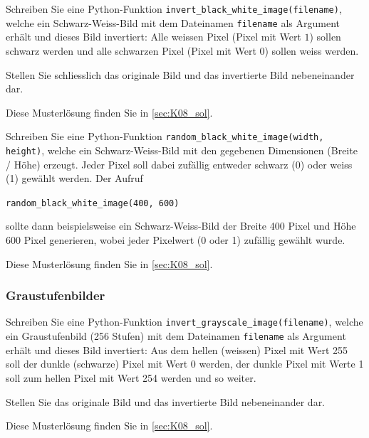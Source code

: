\begin{myexercise}
	Schreiben Sie eine Python-Funktion \lstinline|invert_black_white_image(filename)|, welche ein Schwarz-Weiss-Bild mit dem Dateinamen \lstinline|filename| als Argument erhält und dieses Bild invertiert: Alle weissen Pixel (Pixel mit Wert $1$) sollen schwarz werden und alle schwarzen Pixel (Pixel mit Wert $0$) sollen weiss werden.

	Stellen Sie schliesslich das originale Bild und das invertierte Bild nebeneinander dar.
	\begin{myanswer}
		Diese Musterlösung finden Sie in \cref{sec:K08_sol}.
	\end{myanswer}
\end{myexercise}

\begin{myexercise}
	Schreiben Sie eine Python-Funktion \lstinline|random_black_white_image(width, height)|, welche ein Schwarz-Weiss-Bild mit den gegebenen Dimensionen (Breite / Höhe) erzeugt.
	Jeder Pixel soll dabei zufällig entweder schwarz (0) oder weiss (1) gewählt werden. Der Aufruf
	\begin{center}
		\lstinline|random_black_white_image(400, 600)|
	\end{center}
	sollte dann beispielsweise ein Schwarz-Weiss-Bild der Breite 400 Pixel und Höhe 600 Pixel generieren, wobei jeder Pixelwert (0 oder 1) zufällig gewählt wurde.
	\begin{myanswer}
		Diese Musterlösung finden Sie in \cref{sec:K08_sol}.
	\end{myanswer}
\end{myexercise}

\subsubsection{Graustufenbilder}
\begin{myexercise}
	Schreiben Sie eine Python-Funktion \lstinline|invert_grayscale_image(filename)|, welche ein Graustufenbild (256 Stufen) mit dem Dateinamen \lstinline|filename| als Argument erhält und dieses Bild invertiert: Aus dem hellen (weissen) Pixel mit Wert 255 soll der dunkle (schwarze) Pixel mit Wert 0 werden, der dunkle Pixel mit Werte 1 soll zum hellen Pixel mit Wert 254 werden und so weiter.

	Stellen Sie das originale Bild und das invertierte Bild nebeneinander dar.
	\begin{myanswer}
		Diese Musterlösung finden Sie in \cref{sec:K08_sol}.
	\end{myanswer}
\end{myexercise}


